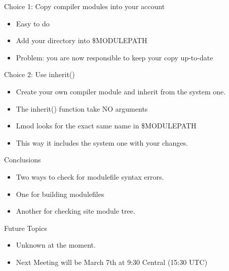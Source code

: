 \documentclass{beamer}
\begin{document}
\begin{frame}{Choice 1: Copy compiler modules into your account}
  \begin{itemize}
    \item Easy to do
    \item Add your directory into \$MODULEPATH
    \item Problem: you are now responsible to keep your copy up-to-date
  \end{itemize}
\end{frame}

\begin{frame}{Choice 2: Use inherit()}
  \begin{itemize}
    \item Create your own compiler module and inherit from the system
      one.
    \item The inherit() function take NO arguments
    \item Lmod looks for the exact same name in \$MODULEPATH
    \item This way it includes the system one with your changes.
  \end{itemize}
\end{frame}





\begin{frame}{Conclusions}
  \begin{itemize}
    \item Two ways to check for modulefile syntax errors.
    \item One for building modulefiles
    \item Another for checking site module tree.
  \end{itemize}
\end{frame}

\begin{frame}{Future Topics}
  \begin{itemize}
    \item Unknown at the moment.
    \item Next Meeting will be March 7th at 9:30 Central (15:30 UTC)
  \end{itemize}
\end{frame}
\end{document}
